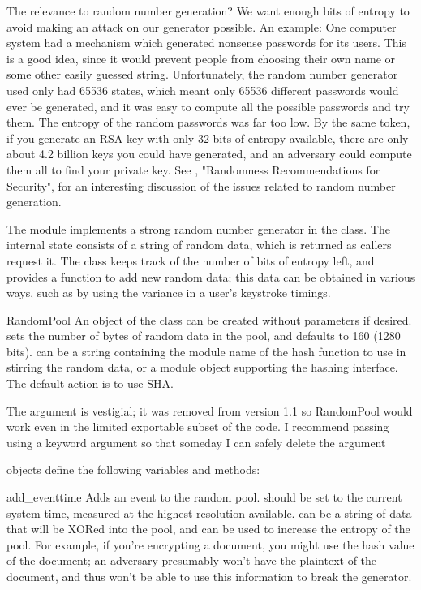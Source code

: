 \documentclass{howto}
\begin{document}
The relevance to random number generation?  We want enough bits of
entropy to avoid making an attack on our generator possible.  An
example: One computer system had a mechanism which generated nonsense
passwords for its users.  This is a good idea, since it would prevent
people from choosing their own name or some other easily guessed string.
Unfortunately, the random number generator used only had 65536 states,
which meant only 65536 different passwords would ever be generated, and
it was easy to compute all the possible passwords and try them.  The
entropy of the random passwords was far too low.  By the same token, if
you generate an RSA key with only 32 bits of entropy available, there
are only about 4.2 billion keys you could have generated, and an
adversary could compute them all to find your private key.  See ,
"Randomness Recommendations for Security", for an interesting discussion
of the issues related to random number generation.

The  module implements a strong random number generator
in the  class.  The internal state consists of a string
of random data, which is returned as callers request it.  The class
keeps track of the number of bits of entropy left, and provides a function to
add new random data; this data can be obtained in various ways, such as
by using the variance in a user's keystroke timings.

\begin{classdesc}{RandomPool}{ }
An object of the  class can be created without
parameters if desired.   sets the number of bytes of
random data in the pool, and defaults to 160 (1280 bits). 
can be a string containing the module name of the hash function to use
in stirring the random data, or a module object supporting the hashing
interface.  The default action is to use SHA.

The  argument is vestigial; it was removed from version
1.1 so RandomPool would work even in the limited exportable subset of
the code.  I recommend passing  using a keyword argument so
that someday I can safely delete the  argument

\end{classdesc}

 objects define the following variables and methods:

\begin{methoddesc}{add_event}{time}
Adds an event to the random pool.   should be set to the
current system time, measured at the highest resolution available.
 can be a string of data that will be XORed into the pool,
and can be used to increase the entropy of the pool.  For example, if
you're encrypting a document, you might use the hash value of the
document; an adversary presumably won't have the plaintext of the
document, and thus won't be able to use this information to break the
generator.
\end{methoddesc}
\end{document}

